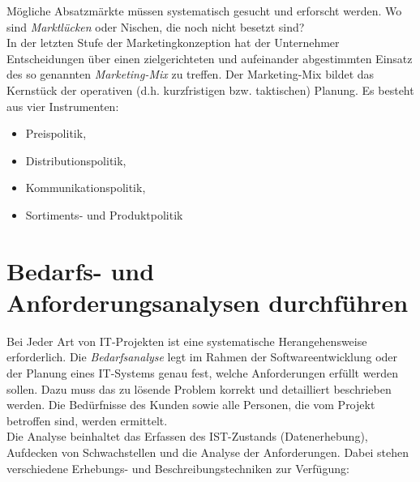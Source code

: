 \documentclass[a4paper, 12pt]{report}
\begin{document}
\begin{multicols}{2}
Mögliche Absatzmärkte müssen systematisch gesucht und erforscht werden. Wo sind
\emph{Marktlücken} oder Nischen, die noch nicht besetzt sind? \\

In der letzten Stufe der Marketingkonzeption hat der Unternehmer Entscheidungen
über einen zielgerichteten und aufeinander abgestimmten Einsatz des so genannten
\emph{Marketing-Mix} zu treffen. Der Marketing-Mix bildet das Kernstück der
operativen (d.h. kurzfristigen bzw. taktischen) Planung. Es besteht aus vier
Instrumenten:

\begin{itemize}
    \item Preispolitik,
    \item Distributionspolitik,
    \item Kommunikationspolitik,
    \item Sortiments- und Produktpolitik
\end{itemize}

\section{Bedarfs- und Anforderungsanalysen durchführen}

Bei Jeder Art von IT-Projekten ist eine systematische Herangehensweise
erforderlich. Die \emph{Bedarfsanalyse} legt im Rahmen der Softwareentwicklung
oder der Planung eines IT-Systems genau fest, welche Anforderungen erfüllt
werden sollen. Dazu muss das zu lösende Problem korrekt und detailliert
beschrieben werden. Die Bedürfnisse des Kunden sowie alle Personen, die vom
Projekt betroffen sind, werden ermittelt. \\

Die Analyse beinhaltet das Erfassen des IST-Zustands (Datenerhebung), Aufdecken
von Schwachstellen und die Analyse der Anforderungen. Dabei stehen verschiedene
Erhebungs- und Beschreibungstechniken zur Verfügung:


\end{multicols}
\end{document}
